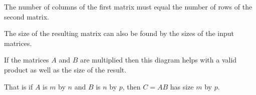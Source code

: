 \begin{Boxed*}
The number of columns of the first matrix must equal the number of rows of the second matrix.
\end{Boxed*}

The size of the resulting matrix can also be found by the sizes of the input matrices.

\begin{Boxed*}
If the matrices $A$ and $B$ are multiplied then this diagram helps with a valid product as well as the size of the result.

\begin{center}
\end{center}

That is if $A$ is $m$ by $n$ and $B$ is $n$ by $p$, then $C=AB$ has size $m$ by $p$.

\end{Boxed*}

